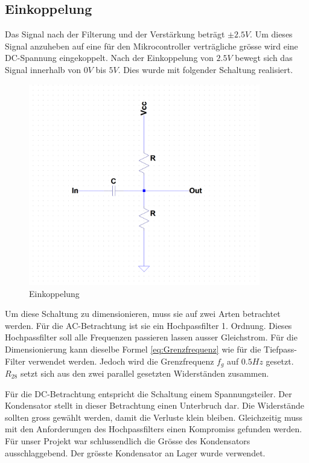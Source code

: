 \subsection{Einkoppelung}
Das Signal nach der Filterung und der Verstärkung beträgt $\pm 2.5V$. Um dieses Signal anzuheben auf eine für den Mikrocontroller verträgliche grösse wird eine DC-Spannung eingekoppelt. Nach der Einkoppelung von $2.5V$ bewegt sich das Signal innerhalb von $0V$ bis $5V$. Dies wurde mit folgender Schaltung realisiert.

\begin{minipage}[h]{0.5\textwidth}
\begin{figure}[H]
\begin{center}
\includegraphics[width=0.9\textwidth]{images/Analoge_Schaltung_Einkoppelung.png}
\caption{Einkoppelung}
\end{center}
\end{figure}
\end{minipage}
\begin{minipage}[h]{0.5\textwidth} 
Um diese Schaltung zu dimensionieren, muss sie auf zwei Arten betrachtet werden. 
Für die AC-Betrachtung ist sie ein Hochpassfilter 1. Ordnung. Dieses Hochpassfilter soll alle Frequenzen passieren lassen ausser Gleichstrom. Für die Dimensionierung kann dieselbe Formel \eqref{eq:Grenzfrequenz} wie für die Tiefpass-Filter verwendet werden. Jedoch wird die Grenzfrequenz $f_g$ auf $0.5 Hz$ gesetzt. $R_{28}$ setzt sich aus den  zwei parallel gesetzten Widerständen zusammen.
\end{minipage}
Für die DC-Betrachtung entspricht die Schaltung einem Spannungsteiler. Der Kondensator stellt in dieser Betrachtung einen Unterbruch dar. Die Widerstände sollten gross gewählt werden, damit die Verluste klein bleiben. Gleichzeitig muss mit den Anforderungen des Hochpassfilters einen Kompromiss gefunden werden. Für unser Projekt war schlussendlich die Grösse des Kondensators ausschlaggebend. Der grösste Kondensator an Lager wurde verwendet.

